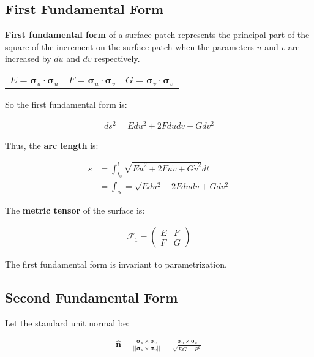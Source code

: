 \documentclass[11pt]{article}
\begin{document}
\subsection{First Fundamental Form}
\label{sec:orgab30d95}
\textbf{First fundamental form} of a surface patch represents the principal part of the square of the increment on the surface patch when the parameters \(u\) and \(v\) are increased by \(du\) and \(dv\) respectively.

\begin{center}
    \begin{tabular}{ c c c }
        $E = \boldsymbol{\sigma}_{u} \cdot \boldsymbol{\sigma}_{u}$ & $F = \boldsymbol{\sigma}_{u} \cdot \boldsymbol{\sigma}_{v}$ & $G = \boldsymbol{\sigma}_{v} \cdot \boldsymbol{\sigma}_{v}$
    \end{tabular}
\end{center}

So the first fundamental form is:

\begin{align*}
    ds^{2} = Edu^{2} + 2Fdudv + Gdv^{2}
\end{align*}

Thus, the \textbf{arc length} is:

\begin{align*}
    s &= \int_{t_{0}}^{t} \sqrt{E\dot{u}^{2} + 2F\dot{u}\dot{v} + G\dot{v}^{2}}dt \\
    &= \int_{\alpha} = \sqrt{Edu^{2} + 2Fdudv + Gdv^{2}}
\end{align*}

The \textbf{metric tensor} of the surface is:

\begin{align*}
    \mathcal{F}_{1} = \begin{pmatrix} E & F \\ F & G \end{pmatrix}
\end{align*}

The first fundamental form is invariant to parametrization.

\subsection{Second Fundamental Form}
\label{sec:orgb199eb4}
Let the standard unit normal be:

\begin{align*}
    \hat{\boldsymbol{n}} = \frac{\boldsymbol{\sigma}_{u} \times \boldsymbol{\sigma}_{v}}{\lvert\lvert \boldsymbol{\sigma}_{u} \times \boldsymbol{\sigma}_{v} \lvert\lvert} = \frac{\boldsymbol{\sigma}_{u} \times \boldsymbol{\sigma}_{v}}{\sqrt{EG - F^{2}}}
\end{align*}
\end{document}
